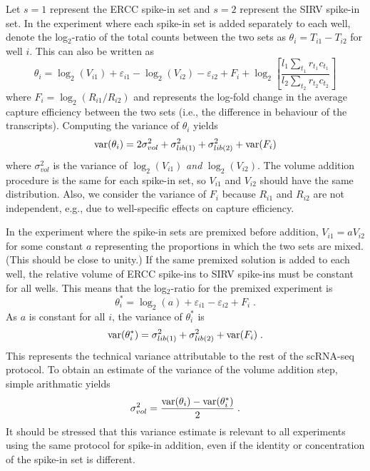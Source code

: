 \documentclass{article}
\begin{document}
Let $s=1$ represent the ERCC spike-in set and $s=2$ represent the SIRV spike-in set.
In the experiment where each spike-in set is added separately to each well, denote the log$_2$-ratio of the total counts between the two sets as $\theta_i = T_{i1} - T_{i2}$ for well $i$.
This can also be written as
\[
    \theta_i = \log_2(V_{i1}) + \varepsilon_{i1} - \log_2(V_{i2}) - \varepsilon_{i2} + F_i + \log_2\left[ \frac{l_1 \sum_{t_1} r_{t_1} c_{t_1}}{l_2\sum_{t_2} r_{t_2} c_{t_2}} \right]
\]
where $F_i = \log_2(R_{i1}/R_{i2})$ and represents the log-fold change in the average capture efficiency between the two sets (i.e., the difference in behaviour of the transcripts).
Computing the variance of $\theta_i$ yields
\[
\mbox{var}(\theta_i) = 2 \sigma^2_{vol} + \sigma^2_{lib(1)} + \sigma^2_{lib(2)} + \mbox{var}(F_i)
\]
where $\sigma^2_{vol}$ is the variance of $\log_2(V_{i1})$ \textit{and} $\log_2(V_{i2})$.
The volume addition procedure is the same for each spike-in set, so $V_{i1}$ and $V_{i2}$ should have the same distribution.
Also, we consider the variance of $F_i$ because $R_{i1}$ and $R_{i2}$ are not independent, e.g., due to well-specific effects on capture efficiency.

In the experiment where the spike-in sets are premixed before addition, $V_{i1}=aV_{i2}$ for some constant $a$ representing the proportions in which the two sets are mixed.
(This should be close to unity.)
If the same premixed solution is added to each well, the relative volume of ERCC spike-ins to SIRV spike-ins must be constant for all wells.
This means that the log$_2$-ratio for the premixed experiment is 
\[
\theta^*_i = \log_2(a) + \varepsilon_{i1} - \varepsilon_{i2} + F_i \;.
\]
As $a$ is constant for all $i$, the variance of $\theta^*_i$ is
\[
\mbox{var}(\theta^*_i) = \sigma^2_{lib(1)} + \sigma^2_{lib(2)} + \mbox{var}(F_i) \;.
\]
This represents the technical variance attributable to the rest of the scRNA-seq protocol.
To obtain an estimate of the variance of the volume addition step, simple arithmatic yields
\[
\sigma^2_{vol} = \frac{\mbox{var}(\theta_i) - \mbox{var}(\theta^*_i)}{2} \;.
\]
It should be stressed that this variance estimate is relevant to all experiments using the same protocol for spike-in addition, even if the identity or concentration of the spike-in set is different.
\end{document}
